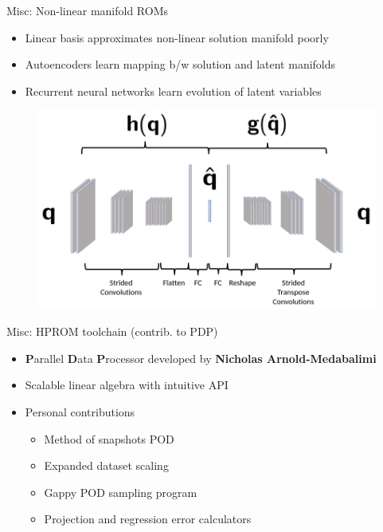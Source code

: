 \documentclass[]{beamer}
\begin{document}
\begin{frame}{Misc: Non-linear manifold ROMs}
	\begin{itemize}
		\item Linear basis approximates non-linear solution manifold poorly
		\item Autoencoders learn mapping b/w solution and latent manifolds
		\item Recurrent neural networks learn evolution of latent variables
	\end{itemize}
	\vspace{2em}
	\begin{minipage}{0.49\linewidth}
		\begin{figure}
			\includegraphics[width=0.99\linewidth]{misc/CAE_dense.png}
		\end{figure}
	\end{minipage}
	\begin{minipage}{0.49\linewidth}
		\begin{figure}
		\end{figure}
	\end{minipage}
\end{frame}

\begin{frame}{Misc: HPROM toolchain (contrib. to PDP)}
	\begin{itemize}
		\item \textbf{P}arallel \textbf{D}ata \textbf{P}rocessor developed by \textbf{Nicholas Arnold-Medabalimi}
		\item Scalable linear algebra with intuitive API
		\item Personal contributions
		\begin{itemize}
			\item Method of snapshots POD
			\item Expanded dataset scaling
			\item Gappy POD sampling program
			\item Projection and regression error calculators
		\end{itemize}
	\end{itemize}
\end{frame}
\end{document}
